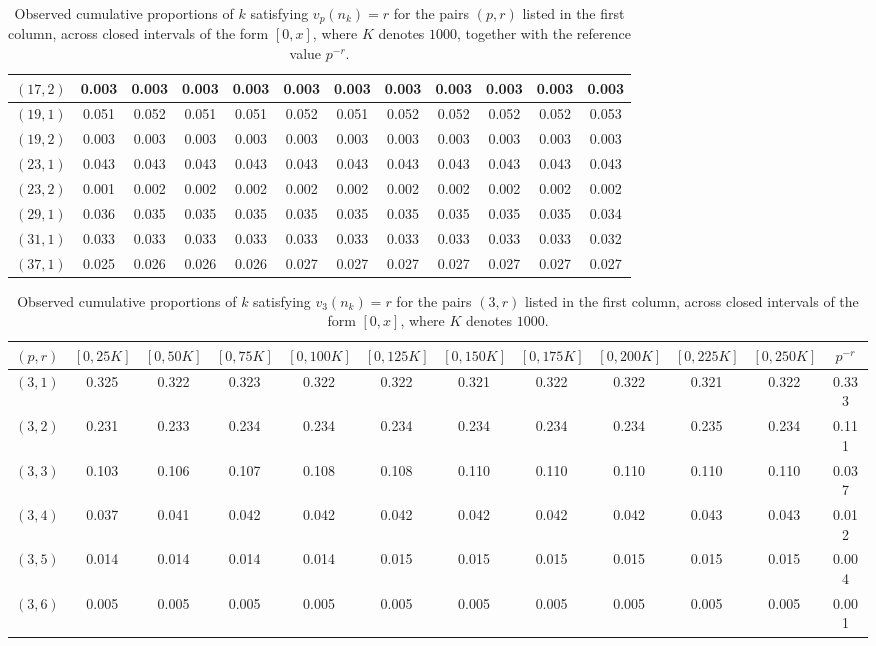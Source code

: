 \documentclass[12pt]{amsart}%
\newcommand{\1}{\mathds{1}}
\theoremstyle{definition}
\numberwithin{equation}{section}
\numberwithin{table}{section}
\numberwithin{figure}{section}
\begin{document}
\begin{table}[htbp]
\begin{tabular}{@{}c|cccccccccc||c@{}}
$(17,2)$ & 0.003 & 0.003 & 0.003 & 0.003 & 0.003 & 0.003 & 0.003 & 0.003 & 0.003 & 0.003 & 0.003 \\
\hline\hline
$(19,1)$ & 0.051 & 0.052 & 0.051 & 0.051 & 0.052 & 0.051 & 0.052 & 0.052 & 0.052 & 0.052 & 0.053 \\
$(19,2)$ & 0.003 & 0.003 & 0.003 & 0.003 & 0.003 & 0.003 & 0.003 & 0.003 & 0.003 & 0.003 & 0.003 \\
\hline\hline
$(23,1)$ & 0.043 & 0.043 & 0.043 & 0.043 & 0.043 & 0.043 & 0.043 & 0.043 & 0.043 & 0.043 & 0.043 \\
$(23,2)$ & 0.001 & 0.002 & 0.002 & 0.002 & 0.002 & 0.002 & 0.002 & 0.002 & 0.002 & 0.002 & 0.002 \\
\hline\hline
$(29,1)$ & 0.036 & 0.035 & 0.035 & 0.035 & 0.035 & 0.035 & 0.035 & 0.035 & 0.035 & 0.035 & 0.034 \\
\hline\hline
$(31,1)$ & 0.033 & 0.033 & 0.033 & 0.033 & 0.033 & 0.033 & 0.033 & 0.033 & 0.033 & 0.033 & 0.032 \\
\hline\hline
$(37,1)$ & 0.025 & 0.026 & 0.026 & 0.026 & 0.027 & 0.027 & 0.027 & 0.027 & 0.027 & 0.027 & 0.027 \\
\end{tabular}
\caption{Observed cumulative proportions of $k$ satisfying $v_p(n_k)=r$ for the pairs $(p,r)$ listed in the first column, across closed intervals of the form $[0,x]$, where $K$ denotes $1000$, together with the reference value $p^{-r}$.}
\label{tab:v5_v7_v11_v13_v17_v19_v23_v29_v31_v37_statistics_cumulative}
\end{table}


\begin{table}
\centering
\scriptsize
\begin{tabular}{@{}c|cccccccccc||c@{}}
$(p,r)$
& $[0,25K]$ & $[0,50K]$ & $[0,75K]$ & $[0,100K]$ & $[0,125K]$
& $[0,150K]$ & $[0,175K]$ & $[0,200K]$ & $[0,225K]$ & $[0,250K]$
& $p^{-r}$ \\
\hline
$(3,1)$ & 0.325 & 0.322 & 0.323 & 0.322 & 0.322 & 0.321 & 0.322 & 0.322 & 0.321 & 0.322 & 0.333 \\
$(3,2)$ & 0.231 & 0.233 & 0.234 & 0.234 & 0.234 & 0.234 & 0.234 & 0.234 & 0.235 & 0.234 & 0.111 \\
$(3,3)$ & 0.103 & 0.106 & 0.107 & 0.108 & 0.108 & 0.110 & 0.110 & 0.110 & 0.110 & 0.110 & 0.037 \\
$(3,4)$ & 0.037 & 0.041 & 0.042 & 0.042 & 0.042 & 0.042 & 0.042 & 0.042 & 0.043 & 0.043 & 0.012 \\
$(3,5)$ & 0.014 & 0.014 & 0.014 & 0.014 & 0.015 & 0.015 & 0.015 & 0.015 & 0.015 & 0.015 & 0.004 \\
$(3,6)$ & 0.005 & 0.005 & 0.005 & 0.005 & 0.005 & 0.005 & 0.005 & 0.005 & 0.005 & 0.005 & 0.001 \\
\end{tabular}
\caption{Observed cumulative proportions of $k$ satisfying $v_3(n_k)=r$ for the pairs $(3,r)$ listed in the first column, across closed intervals of the form $[0,x]$, where $K$ denotes $1000$.}
\label{tab:v3_statistics_cumulative}
\end{table}
\end{document}
